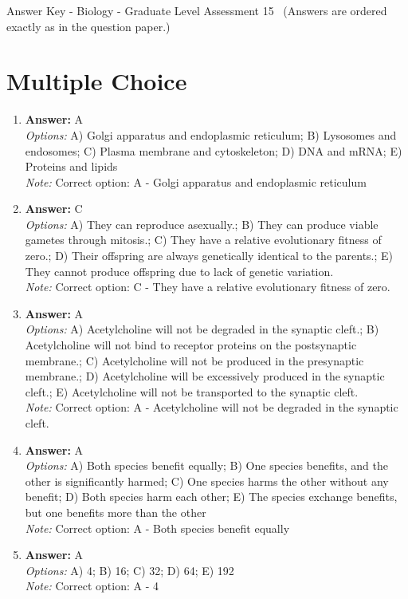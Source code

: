 \documentclass[12pt]{article}
\begin{document}
\begin{center}
Answer Key - Biology - Graduate Level Assessment 15 \
\small (Answers are ordered exactly as in the question paper.)
\end{center}

\section*{Multiple Choice}
\begin{enumerate}[label=\arabic*.]
\item \textbf{Answer:} A
\\ \textit{Options:} A) Golgi apparatus and endoplasmic reticulum; B) Lysosomes and endosomes; C) Plasma membrane and cytoskeleton; D) DNA and mRNA; E) Proteins and lipids
\\ \textit{Note:} Correct option: A - Golgi apparatus and endoplasmic reticulum
\item \textbf{Answer:} C
\\ \textit{Options:} A) They can reproduce asexually.; B) They can produce viable gametes through mitosis.; C) They have a relative evolutionary fitness of zero.; D) Their offspring are always genetically identical to the parents.; E) They cannot produce offspring due to lack of genetic variation.
\\ \textit{Note:} Correct option: C - They have a relative evolutionary fitness of zero.
\item \textbf{Answer:} A
\\ \textit{Options:} A) Acetylcholine will not be degraded in the synaptic cleft.; B) Acetylcholine will not bind to receptor proteins on the postsynaptic membrane.; C) Acetylcholine will not be produced in the presynaptic membrane.; D) Acetylcholine will be excessively produced in the synaptic cleft.; E) Acetylcholine will not be transported to the synaptic cleft.
\\ \textit{Note:} Correct option: A - Acetylcholine will not be degraded in the synaptic cleft.
\item \textbf{Answer:} A
\\ \textit{Options:} A) Both species benefit equally; B) One species benefits, and the other is significantly harmed; C) One species harms the other without any benefit; D) Both species harm each other; E) The species exchange benefits, but one benefits more than the other
\\ \textit{Note:} Correct option: A - Both species benefit equally
\item \textbf{Answer:} A
\\ \textit{Options:} A) 4; B) 16; C) 32; D) 64; E) 192
\\ \textit{Note:} Correct option: A - 4
\end{enumerate}
\end{document}
